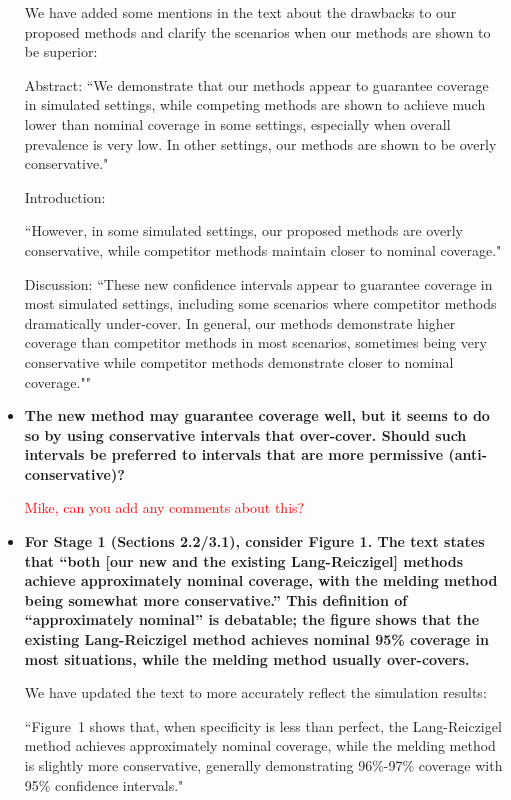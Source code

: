 \documentclass[11pt]{article}
\begin{document}
\begin{itemize}
    We have added some mentions in the text about the drawbacks to our proposed methods and clarify the scenarios when our methods are shown to be superior:
    
    Abstract:
    ``We demonstrate that our methods appear to guarantee coverage in simulated settings, while competing methods are shown to achieve much lower than nominal coverage in some settings, especially when overall prevalence is very low. In other settings, our methods are shown to be overly conservative."
    
    Introduction:
    
    ``However, in some simulated settings, our proposed methods are overly conservative, while competitor methods maintain closer to nominal coverage."

    Discussion:
    ``These new confidence intervals appear to guarantee coverage in most simulated settings, including some scenarios where competitor methods dramatically under-cover.
    In general, our methods demonstrate higher coverage than competitor methods in most scenarios, sometimes being very conservative while competitor methods demonstrate closer to nominal coverage.""

    \item \textbf{The new method may guarantee coverage well, but it seems to do so by using conservative intervals that over-cover. Should such intervals be preferred to intervals that are more permissive (anti-conservative)?}
    
    \textcolor{red}{Mike, can you add any comments about this?}


    \item \textbf{For Stage 1 (Sections 2.2/3.1), consider Figure 1. The text states that “both [our new and the existing Lang-Reiczigel] methods achieve approximately nominal coverage, with the melding method being somewhat more conservative.” This definition of “approximately nominal” is debatable; the figure shows that the existing Lang-Reiczigel method achieves nominal 95\% coverage in most situations, while the melding method usually over-covers.}
    
    We have updated the text to more accurately reflect the simulation results:
    
    ``Figure~1 shows that, when specificity is less than perfect, the Lang-Reiczigel method achieves approximately nominal coverage, while the melding method is slightly more conservative, generally demonstrating 96\%-97\% coverage with 95\% confidence intervals."


\end{itemize}
\end{document}
